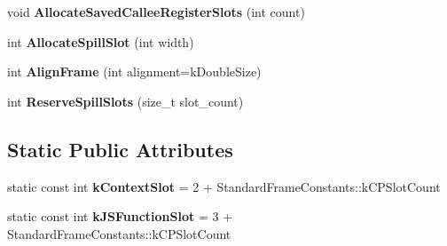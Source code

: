 \begin{DoxyCompactItemize}
\item 
void {\bfseries Allocate\+Saved\+Callee\+Register\+Slots} (int count)\hypertarget{classv8_1_1internal_1_1compiler_1_1_frame_a4e64d39cd47e6a1761f353367648a6e0}{}\label{classv8_1_1internal_1_1compiler_1_1_frame_a4e64d39cd47e6a1761f353367648a6e0}

\item 
int {\bfseries Allocate\+Spill\+Slot} (int width)\hypertarget{classv8_1_1internal_1_1compiler_1_1_frame_a7a938dabcb2842c32ea13a11b9839d38}{}\label{classv8_1_1internal_1_1compiler_1_1_frame_a7a938dabcb2842c32ea13a11b9839d38}

\item 
int {\bfseries Align\+Frame} (int alignment=k\+Double\+Size)\hypertarget{classv8_1_1internal_1_1compiler_1_1_frame_ae75e2c220522bf150ba87b81b5bb0433}{}\label{classv8_1_1internal_1_1compiler_1_1_frame_ae75e2c220522bf150ba87b81b5bb0433}

\item 
int {\bfseries Reserve\+Spill\+Slots} (size\+\_\+t slot\+\_\+count)\hypertarget{classv8_1_1internal_1_1compiler_1_1_frame_a3b2080967bb6f7ed3bdbae804ccbbefd}{}\label{classv8_1_1internal_1_1compiler_1_1_frame_a3b2080967bb6f7ed3bdbae804ccbbefd}

\end{DoxyCompactItemize}
\subsection*{Static Public Attributes}
\begin{DoxyCompactItemize}
\item 
static const int {\bfseries k\+Context\+Slot} = 2 + Standard\+Frame\+Constants\+::k\+C\+P\+Slot\+Count\hypertarget{classv8_1_1internal_1_1compiler_1_1_frame_a2e2093ebc494cb6d3d7d1d79512cf073}{}\label{classv8_1_1internal_1_1compiler_1_1_frame_a2e2093ebc494cb6d3d7d1d79512cf073}

\item 
static const int {\bfseries k\+J\+S\+Function\+Slot} = 3 + Standard\+Frame\+Constants\+::k\+C\+P\+Slot\+Count\hypertarget{classv8_1_1internal_1_1compiler_1_1_frame_a946116e379b05bab71787a0d8446dd94}{}\label{classv8_1_1internal_1_1compiler_1_1_frame_a946116e379b05bab71787a0d8446dd94}

\end{DoxyCompactItemize}
